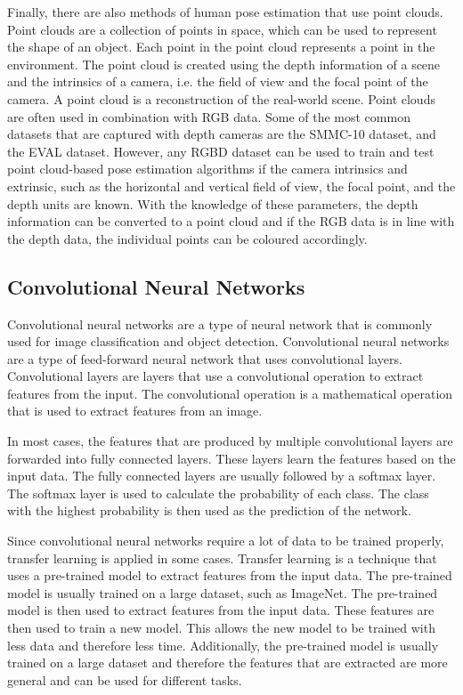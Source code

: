 Finally, there are also methods of human pose estimation that use point clouds. Point clouds are a collection of points in space, which can be used to represent the shape of an object. Each point in the point cloud represents a point in the environment. The point cloud is created using the depth information of a scene and the intrinsics of a camera, i.e. the field of view and the focal point of the camera. A point cloud is a reconstruction of the real-world scene. Point clouds are often used in combination with RGB data. Some of the most common datasets that are captured with depth cameras are the SMMC-10 dataset\cite{SMMC10}, and the EVAL dataset\cite{EVAL}. However, any RGBD dataset can be used to train and test point cloud-based pose estimation algorithms if the camera intrinsics and extrinsic, such as the horizontal and vertical field of view, the focal point, and the depth units are known. With the knowledge of these parameters, the depth information can be converted to a point cloud and if the RGB data is in line with the depth data, the individual points can be coloured accordingly.

\subsection{Convolutional Neural Networks}

Convolutional neural networks are a type of neural network that is commonly used for image classification and object detection. Convolutional neural networks are a type of feed-forward neural network that uses convolutional layers. Convolutional layers are layers that use a convolutional operation to extract features from the input. The convolutional operation is a mathematical operation that is used to extract features from an image. 

In most cases, the features that are produced by multiple convolutional layers are forwarded into fully connected layers. These layers learn the features based on the input data. The fully connected layers are usually followed by a softmax layer. The softmax layer is used to calculate the probability of each class. The class with the highest probability is then used as the prediction of the network.

Since convolutional neural networks require a lot of data to be trained properly, transfer learning is applied in some cases. Transfer learning is a technique that uses a pre-trained model to extract features from the input data. The pre-trained model is usually trained on a large dataset, such as ImageNet\cite{ImageNet}. The pre-trained model is then used to extract features from the input data. These features are then used to train a new model. This allows the new model to be trained with less data and therefore less time. Additionally, the pre-trained model is usually trained on a large dataset and therefore the features that are extracted are more general and can be used for different tasks. 

